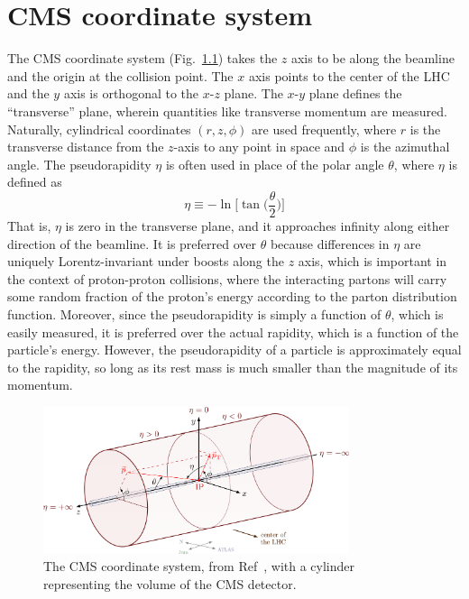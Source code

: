 \chapter{CMS coordinate system}
The CMS coordinate system (Fig.~\ref{fig:cms_coords}) takes the $z$ axis to be along the beamline and the origin at the collision point. 
The $x$ axis points to the center of the LHC and the $y$ axis is orthogonal to the $x$-$z$ plane. 
The $x$-$y$ plane defines the ``transverse'' plane, wherein quantities like transverse momentum \pt are measured. 
Naturally, cylindrical coordinates $(r,z,\phi)$ are used frequently, where $r$ is the transverse distance from the $z$-axis to any point in space and $\phi$ is the azimuthal angle. 
The pseudorapidity $\eta$ is often used in place of the polar angle $\theta$, where $\eta$ is defined as
\begin{equation}
    \eta \equiv -\ln{\bigg[\tan\bigg(\frac{\theta}{2}\bigg)\bigg]}
\end{equation}
That is, $\eta$ is zero in the transverse plane, and it approaches infinity along either direction of the beamline. 
It is preferred over $\theta$ because differences in $\eta$ are uniquely Lorentz-invariant under boosts along the $z$ axis, which is important in the context of proton-proton collisions, where the interacting partons will carry some random fraction of the proton's energy according to the parton distribution function. 
Moreover, since the pseudorapidity is simply a function of $\theta$, which is easily measured, it is preferred over the actual rapidity, which is a function of the particle's energy. 
However, the pseudorapidity of a particle is approximately equal to the rapidity, so long as its rest mass is much smaller than the magnitude of its momentum. 

\begin{figure}[htb]
    \centering
    \includegraphics[width=0.8\textwidth]{fig/cms/coord_system.png}
    \caption[The CMS coordinate system]{
        The CMS coordinate system, from Ref~\cite{CMSCoords}, with a cylinder representing the volume of the CMS detector. 
    }
    \label{fig:cms_coords}
\end{figure}
